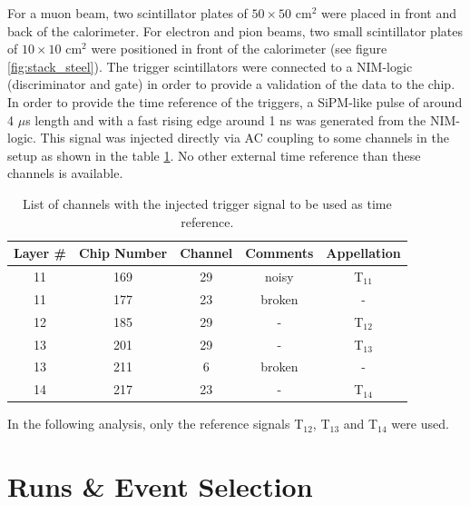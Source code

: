 \documentclass[twoside,a4paper,11pt]{article}
\begin{document}
For a muon beam, two scintillator plates of $50\times50$ cm$^2$ were placed in front and back of the calorimeter. For electron and pion beams, two small scintillator plates of $10\times10$ cm$^2$ were positioned in front of the calorimeter (see figure \ref{fig:stack_steel}). The trigger scintillators were connected to a NIM-logic (discriminator and gate) in order to provide a validation of the data to the chip. 
In order to provide the time reference of the triggers, a SiPM-like pulse of around 4 $\mu$s length and with a fast rising edge around 1 ns was generated from the NIM-logic. This signal was injected directly via AC coupling to some channels in the setup as shown in the table \ref{table:trigger_signal_list}. No other external time reference than these channels is available.
\begin{table}[htbp]
\centering
  \begin{tabular}{@{} ccccc @{}}
    \hline
    Layer \# & Chip Number & Channel & Comments & Appellation \\ 
    \hline
    11 & 169 & 29 & noisy & T$_{11}$ \\ 
    11 & 177 & 23 & broken & - \\
    12 & 185 & 29 & - & T$_{12}$ \\ 
    13 & 201 & 29 & -  & T$_{13}$ \\
    13 & 211 & 6 & broken & - \\ 
    14 & 217 & 23 & - & T$_{14}$ \\
    \hline
  \end{tabular}
  \caption{List of channels with the injected trigger signal to be used as time reference.}
  \label{table:trigger_signal_list}
\end{table}
In the following analysis, only the reference signals T$_{12}$,  T$_{13}$ and T$_{14}$ were used.

\section{Runs \& Event Selection}
\end{document}
